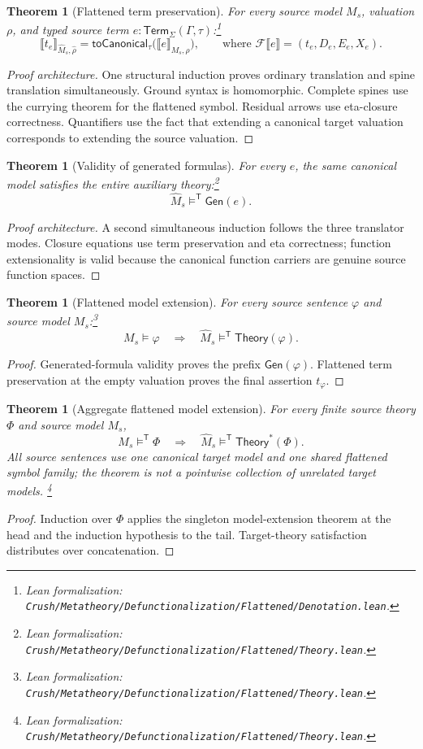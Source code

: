 \documentclass[11pt]{article}
\newtheorem{theorem}[definition]{Theorem}
\theoremstyle{remark}
\newcommand{\leanfile}[1]{\footnote{Lean formalization: \texttt{Crush/Metatheory/#1}.}}
\newcommand{\den}[3]{\llbracket #1\rrbracket_{#2,#3}}
\newcommand{\flattr}[1]{\mathcal F\llbracket #1\rrbracket}
\newcommand{\sat}{\models}
\newcommand{\satt}{\models^{\mathsf T}}
\newcommand{\Gen}{\mathsf{Gen}}
\newcommand{\Theory}{\mathsf{Theory}}
\newcommand{\Theorys}[1]{\mathsf{Theory}^{\!*}(#1)}
\newcommand{\HOTerm}[4]{#3:\mathsf{Term}_{#1}(#2,#4)}
\begin{document}
\begin{theorem}[Flattened term preservation]
For every source model $M_s$, valuation $\rho$, and typed source term
$\HOTerm{\Sigma}{\Gamma}{e}{\tau}$:\leanfile{Defunctionalization/Flattened/Denotation.lean}
\[
 \den{t_e}{\widehat M_s}{\widehat\rho}
 =\mathsf{toCanonical}_\tau\bigl(\den{e}{M_s}{\rho}\bigr),
 \qquad\text{where }\flattr{e}=(t_e,D_e,E_e,X_e).
\]
\end{theorem}
\begin{proof}[Proof architecture]
One structural induction proves ordinary translation and spine translation
simultaneously. Ground syntax is homomorphic. Complete spines use the currying
theorem for the flattened symbol. Residual arrows use eta-closure correctness.
Quantifiers use the fact that extending a canonical target valuation corresponds
to extending the source valuation.
\end{proof}

\begin{theorem}[Validity of generated formulas]
For every $e$, the same canonical model satisfies the entire auxiliary
theory:\leanfile{Defunctionalization/Flattened/Theory.lean}
\[
 \widehat M_s\satt\Gen(e).
\]
\end{theorem}
\begin{proof}[Proof architecture]
A second simultaneous induction follows the three translator modes. Closure
equations use term preservation and eta correctness; function extensionality is
valid because the canonical function carriers are genuine source function
spaces.
\end{proof}

\begin{theorem}[Flattened model extension]
For every source sentence $\varphi$ and source model
$M_s$:\leanfile{Defunctionalization/Flattened/Theory.lean}
\[
 M_s\sat\varphi
 \quad\Longrightarrow\quad
 \widehat M_s\satt\Theory(\varphi).
\]
\end{theorem}
\begin{proof}
Generated-formula validity proves the prefix $\Gen(\varphi)$. Flattened term
preservation at the empty valuation proves the final assertion $t_\varphi$.
\end{proof}

\begin{theorem}[Aggregate flattened model extension]
For every finite source theory $\Phi$ and source model $M_s$,
\[
 M_s\satt\Phi
 \quad\Longrightarrow\quad
 \widehat M_s\satt\Theorys{\Phi}.
\]
All source sentences use one canonical target model and one shared flattened
symbol family; the theorem is not a pointwise collection of unrelated target
models.
\leanfile{Defunctionalization/Flattened/Theory.lean}
\end{theorem}
\begin{proof}
Induction over $\Phi$ applies the singleton model-extension theorem at the head
and the induction hypothesis to the tail. Target-theory satisfaction distributes
over concatenation.
\end{proof}
\end{document}
